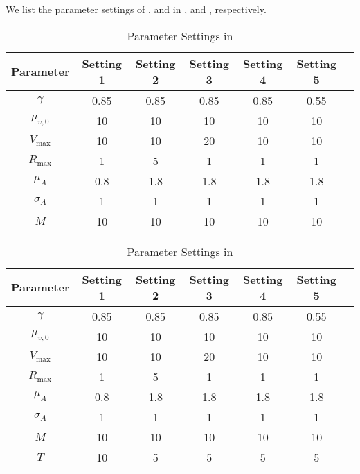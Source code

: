 { We list the parameter settings of ,    and  in ,  and , respectively.


\begin{table}[h!]
    \centering
    \begin{tabular}{c|cccccc}
        Parameter & Setting 1 & Setting 2 & Setting 3 & Setting 4 & Setting 5 \\ \toprule 
        $\gamma$ & 0.85 & 0.85 & 0.85 & 0.85 & 0.55  \\
        $\mu_{v,0}$ & 10 & 10 & 10 & 10 & 10 \\
        $V_{\max}$ & 10 & 10 & 20 & 10 & 10\\
        $R_{\max}$ & 1 & 5 & 1 & 1 & 1\\
        $\mu_A$ & 0.8 & 1.8 & 1.8 & 1.8 & 1.8\\
        $\sigma_A$ & 1 & 1 & 1 & 1 & 1 \\
        $M$ & 10 &  10 &  10 &  10 &  10 \\
    \end{tabular}
    \caption{Parameter Settings in }
    \label{tab:set1}
\end{table}

\begin{table}[h!]
    \centering
    \begin{tabular}{c|cccccc}
        Parameter & Setting 1 & Setting 2 & Setting 3 & Setting 4 & Setting 5 \\ \toprule 
        $\gamma$ & 0.85 & 0.85 & 0.85 & 0.85 & 0.55  \\
        $\mu_{v,0}$ & 10 & 10 & 10 & 10 & 10 \\
        $V_{\max}$ & 10 & 10 & 20 & 10 & 10\\
        $R_{\max}$ & 1 & 5 & 1 & 1 & 1\\
        $\mu_A$ & 0.8 & 1.8 & 1.8 & 1.8 & 1.8\\
        $\sigma_A$ & 1 & 1 & 1 & 1 & 1 \\
        $M$ & 10 &  10 &  10 &  10 &  10 \\
        $T$ & 10 & 5 & 5 &5 &5 \\
    \end{tabular}
    \caption{Parameter Settings in }
    \label{tab:set2}
\end{table}


}
